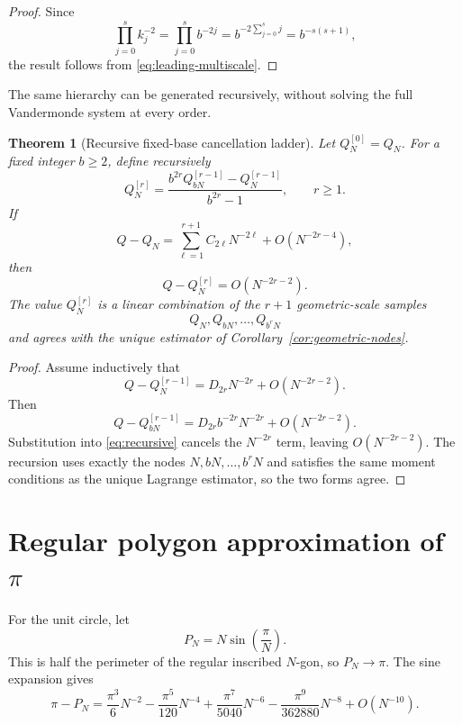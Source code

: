 \documentclass[11pt]{article}
\newtheorem{theorem}{Theorem}[section]
\theoremstyle{remark}
\begin{document}
\begin{proof}
Since
\[
\prod_{j=0}^{s}k_j^{-2}
=
\prod_{j=0}^{s}b^{-2j}
=
b^{-2\sum_{j=0}^{s}j}
=
b^{-s(s+1)},
\]
the result follows from \eqref{eq:leading-multiscale}.
\end{proof}

The same hierarchy can be generated recursively, without solving the full
Vandermonde system at every order.

\begin{theorem}[Recursive fixed-base cancellation ladder]
\label{thm:recursive}
Let $Q_N^{[0]}=Q_N$.  For a fixed integer $b\ge2$, define recursively
\begin{equation}
\label{eq:recursive}
Q_N^{[r]}
=
\frac{b^{2r}Q_{bN}^{[r-1]}-Q_N^{[r-1]}}
{b^{2r}-1},
\qquad r\ge1.
\end{equation}
If
\[
Q-Q_N
=
\sum_{\ell=1}^{r+1}C_{2\ell}N^{-2\ell}
+O(N^{-2r-4}),
\]
then
\[
Q-Q_N^{[r]}
=
O(N^{-2r-2}).
\]
The value $Q_N^{[r]}$ is a linear combination of the $r+1$ geometric-scale
samples
\[
Q_N,Q_{bN},\ldots,Q_{b^rN}
\]
and agrees with the unique estimator of
Corollary~\ref{cor:geometric-nodes}.
\end{theorem}

\begin{proof}
Assume inductively that
\[
Q-Q_N^{[r-1]}
=
D_{2r}N^{-2r}+O(N^{-2r-2}).
\]
Then
\[
Q-Q_{bN}^{[r-1]}
=
D_{2r}b^{-2r}N^{-2r}+O(N^{-2r-2}).
\]
Substitution into \eqref{eq:recursive} cancels the $N^{-2r}$ term, leaving
$O(N^{-2r-2})$.  The recursion uses exactly the nodes
$N,bN,\ldots,b^rN$ and satisfies the same moment conditions as the unique
Lagrange estimator, so the two forms agree.
\end{proof}

\section{Regular polygon approximation of \texorpdfstring{$\pi$}{pi}}

For the unit circle, let
\begin{equation}
\label{eq:polygon-pi}
P_N
=
N\sin\!\left(\frac{\pi}{N}\right).
\end{equation}
This is half the perimeter of the regular inscribed $N$-gon, so
$P_N\to\pi$.  The sine expansion gives
\begin{equation}
\label{eq:pi-expansion}
\pi-P_N
=
\frac{\pi^3}{6}N^{-2}
-
\frac{\pi^5}{120}N^{-4}
+
\frac{\pi^7}{5040}N^{-6}
-
\frac{\pi^9}{362880}N^{-8}
+O(N^{-10}).
\end{equation}
\end{document}
